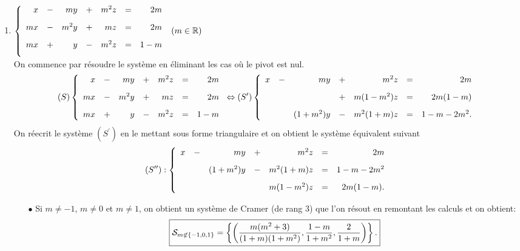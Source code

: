 \documentclass[a4paper, 11pt,reqno]{article}
\begin{document}
\begin{correction}
\begin{enumerate}
\begin{itemize}
\begin{itemize}
$$\fbox{$\mathcal{S}_{m=-\demi}=\left\lbrace (-2+y,y),\ y\in\R  \right\rbrace.$}$$
\end{itemize}
\item[$\bullet$] Si $m=-1$, on obtient en rempla\c cant dans le syst\`eme de d\'epart :
$$
\left\lbrace\begin{array}{rrrrrrr}
& - & y & = & -2\vsec\\
-x &  &  & = & 1\vsec\\
\end{array}\right.
$$
Ainsi, on a : 
\end{itemize}
\item 
$\left\lbrace\begin{array}{rrrrrrr}
x &- & my &+ & m^2z & = & 2m\vsec\\
mx &- & m^2y &+ & mz & = & 2m\vsec\\
mx &+ & y &- & m^2z & = & 1-m\vsec\\
\end{array}\right.$    $(m\in\mathbb{R})$\\
\noindent On commence par r\'esoudre le syst\`eme en \'eliminant les cas o\`u le pivot est nul.
$$(S)\left\lbrace\begin{array}{rrrrrrr}
x&-&my&+&m^2z&=&2m\vsec\\
mx&-&m^2y&+&mz&=&2m\vsec\\
mx&+&y&-&m^2z&=&1-m
\end{array}\right.
\Leftrightarrow (S^{\prime})
\left\lbrace\begin{array}{rrrrrrr}
x&-&my&+&m^2z&=&2m\vsec\\
&& &+&m(1-m^2)z&=&2m(1-m)\vsec\\
&&(1+m^2)y&-&m^2(1+m)z&=&1-m-2m^2.
\end{array}\right.
$$
On r\'eecrit le syst\`eme $(S^{\prime})$ en le mettant sous forme triangulaire et on obtient le syst\`eme \'equivalent suivant
$$(S^{\prime\prime}) : \left\lbrace\begin{array}{rrrrrrr}
x&-&my&+&m^2z&=&2m\vsec\\
&&(1+m^2)y&-&m^2(1+m)z&=&1-m-2m^2\vsec\\
&& &&m(1-m^2)z&=&2m(1-m).
\end{array}\right.
$$
\begin{itemize}
 \item[$\bullet$] Si $m\not= -1$, $m\not= 0$ et $m\not= 1$, on obtient un syst\`eme de Cramer (de rang 3) que l'on r\'esout en remontant les calculs et on obtient:
$$\fbox{$\mathcal{S}_{m\not \in \{-1,0,1\}}=\left\lbrace  \left( \displaystyle\frac{m(m^2+3)}{(1+m)(1+m^2)},  \displaystyle\frac{1-m}{1+m^2}  ,\displaystyle\frac{2}{1+m}     \right) \right\rbrace.$}$$

\end{itemize}
\end{enumerate}
\end{correction}
\end{document}
